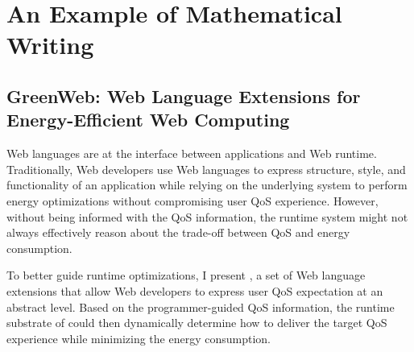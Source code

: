 \chapter{An Example of Mathematical Writing}
%

\section{GreenWeb: Web Language Extensions for Energy-Efficient Web Computing}
\label{sec:lang}


Web languages are at the interface between applications and Web runtime. Traditionally, Web developers use Web languages to express structure, style, and functionality of an application while relying on the underlying system to perform energy optimizations without compromising user QoS experience. However, without being informed with the QoS information, the runtime system might not always effectively reason about the trade-off between QoS and energy consumption.

To better guide runtime optimizations, I present \greenweb, a set of Web language extensions that allow Web developers to express user QoS expectation at an abstract level. Based on the programmer-guided QoS information, the runtime substrate of \greenweb could then dynamically determine how to deliver the target QoS experience while minimizing the energy consumption.


